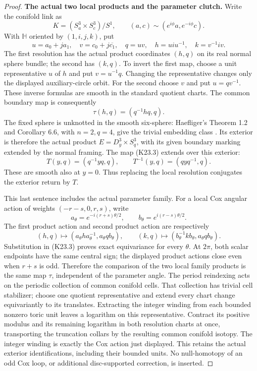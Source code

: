 \begin{proof}
\par\medskip\noindent\textbf{The actual two local products and the parameter clutch.}\enspace
Write the conifold link as
\[
 K=(S^3_a\times S^3_c)/S^1,\qquad
 (a,c)\sim(e^{i\phi}a,e^{-i\phi}c).
\]
With \(\mathbb H\) oriented by \((1,i,j,k)\), put
\[
 u=a_0+j a_1,\quad v=c_0+j\overline{c_1},\quad
 q=uv,\quad h=u i u^{-1},\quad k=v^{-1} i v.
                                                        \tag{K23.2}
\]
The first resolution has the actual product coordinates \((h,q)\)
on its real normal sphere bundle; the second has \((k,q)\).
To invert the first map, choose a unit representative \(u\) of \(h\)
and put \(v=u^{-1}q\). Changing the representative changes only the
displayed auxiliary-circle orbit. For the second choose \(v\) and
put \(u=qv^{-1}\). These inverse formulas are smooth in the standard
quotient charts. The common boundary map is consequently
\[
             \tau(h,q)=(q^{-1}h q,q).                  \tag{K23.3}
\]
The fixed sphere is unknotted in the smooth six-sphere:
Haefliger's Theorem 1.2 and Corollary 6.6, with \(n=2,q=4\),
give the trivial embedding class \cite{Haefliger1966}.
Its exterior is therefore the actual product
\(E=D^3_y\times S^3_q\), with its given boundary marking extended
by the normal framing. The map (K23.3) extends over this exterior:
\[
 T(y,q)=(q^{-1}yq,q),\qquad
 T^{-1}(y,q)=(q yq^{-1},q).                           \tag{K23.4}
\]
These are smooth also at \(y=0\). Thus replacing the local resolution
conjugates the exterior return by \(T\).

This last sentence includes the actual parameter family. For a
local Cox angular action of weights
\((-r-s,0,r,s)\), write
\[
 a_\theta=e^{-i(r+s)\theta/2},\qquad
 b_\theta=e^{i(r-s)\theta/2}.
\]
The first product action and second product action are respectively
\[
 (h,q)\longmapsto
 (a_\theta h a_\theta^{-1},a_\theta q b_\theta),\qquad
 (k,q)\longmapsto
 (b_\theta^{-1}k b_\theta,a_\theta q b_\theta).
\]
Substitution in (K23.3) proves exact equivariance for every \(\theta\).
At \(2\pi\), both scalar endpoints have the same central sign;
the displayed product actions close even when \(r+s\) is odd.
Therefore the comparison of the two local family products is the
same map \(\tau\), independent of the parameter angle. The period
reindexing acts on the periodic collection of common conifold cells.
That collection has trivial cell stabilizer; choose one quotient
representative and extend every chart change equivariantly to its
translates. Extracting the integer winding from each bounded
nonzero toric unit leaves a logarithm on this representative. Contract
its positive modulus and its remaining logarithm in both resolution
charts at once, transporting the truncation collars by the resulting
common conifold isotopy. The integer winding is exactly the Cox
action just displayed. This retains the actual exterior
identifications, including their bounded units. No null-homotopy of
an odd Cox loop, or additional disc-supported correction, is inserted.


\end{proof}
